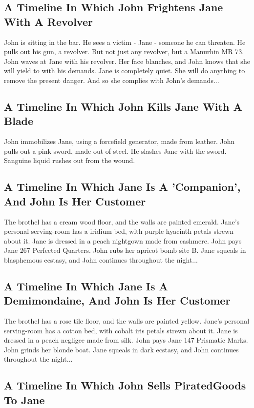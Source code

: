 \documentclass{article}
\begin{document}
\subsection{A Timeline In Which John Frightens Jane With A Revolver}


John is sitting in the bar.
He sees a victim {-} Jane {-} someone he can threaten. He pulls out his gun, a revolver.
But not just any revolver, but a Manurhin MR 73.
John waves at Jane with his revolver. Her face blanches, and John knows that she will yield to with his demands.
Jane is completely quiet. She will do anything to remove the present danger. And so she complies with John's demands...
\subsection{A Timeline In Which John Kills Jane With A Blade}


John immobilizes Jane, using a forcefield generator, made from leather.
John pulls out a pink sword, made out of steel.
He slashes Jane with the sword.
Sanguine liquid rushes out from the wound.
\subsection{A Timeline In Which Jane Is A 'Companion', And John Is Her Customer}


The brothel has a cream wood floor, and the walls are painted emerald.
Jane's personal serving{-}room has a iridium bed, with purple hyacinth petals strewn about it.
Jane is dressed in a peach nightgown made from cashmere.
John pays Jane 267 Perfected Quarters.
John rubs her apricot bomb site B.
Jane squeals in blasphemous ecstasy, and John continues throughout the night...
\subsection{A Timeline In Which Jane Is A Demimondaine, And John Is Her Customer}


The brothel has a rose tile floor, and the walls are painted yellow.
Jane's personal serving{-}room has a cotton bed, with cobalt iris petals strewn about it.
Jane is dressed in a peach negligee made from silk.
John pays Jane 147 Prismatic Marks.
John grinds her blonde boat.
Jane squeals in dark ecstasy, and John continues throughout the night...
\subsection{A Timeline In Which John Sells PiratedGoods To Jane}
\end{document}

